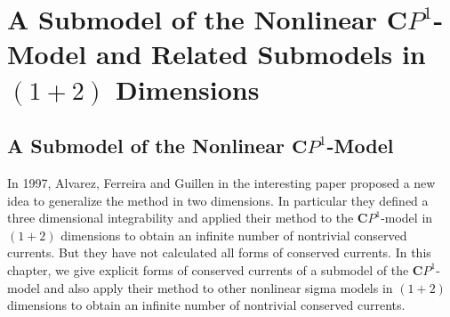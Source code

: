 \documentclass[makeidx,12pt,openany]{report}
\begin{document}
\part{A Submodel of the Nonlinear ${\mathbf{C}}P^1$-Model 
and Related Submodels in $(1+2)$ Dimensions}

\chapter{A Submodel of the Nonlinear ${\mathbf{C}}P^1$-Model}

In 1997, Alvarez, Ferreira and Guillen in the interesting paper \cite{AFG1} 
proposed a new idea to generalize the method in two dimensions. In particular 
they defined a three dimensional integrability and applied their method to 
the $\mathbf{C}P^1$-model in $(1+2)$ dimensions to obtain an infinite number 
of nontrivial conserved currents. But they have not calculated all forms of 
conserved currents. In this chapter, we give explicit forms of conserved 
currents of a 
submodel of the $\mathbf{C}P^1$-model and also apply their method to other 
nonlinear sigma models in $(1+2)$ dimensions to obtain an infinite number 
of nontrivial conserved currents. 

\end{document}
